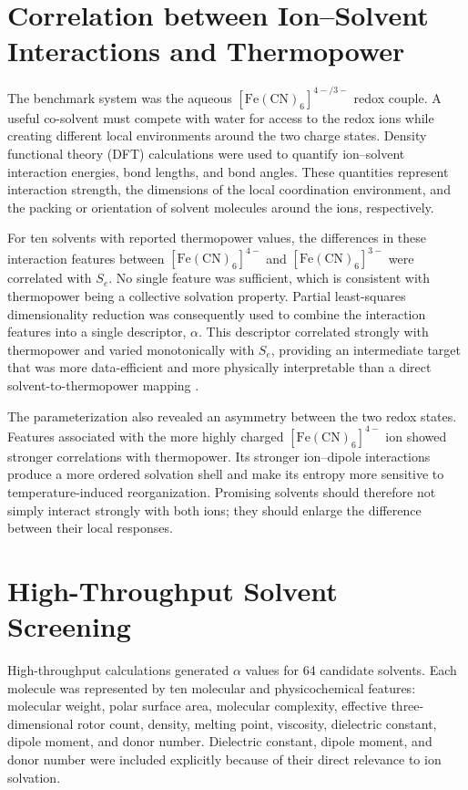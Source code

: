 \section{Correlation between Ion--Solvent Interactions and Thermopower}

The benchmark system was the aqueous
$[\mathrm{Fe(CN)}_6]^{4-/3-}$ redox couple. A useful co-solvent must compete
with water for access to the redox ions while creating different local
environments around the two charge states. Density functional theory (DFT)
calculations were used to quantify ion--solvent interaction energies, bond
lengths, and bond angles. These quantities represent interaction strength, the
dimensions of the local coordination environment, and the packing or
orientation of solvent molecules around the ions, respectively.

For ten solvents with reported thermopower values, the differences in these
interaction features between $[\mathrm{Fe(CN)}_6]^{4-}$ and
$[\mathrm{Fe(CN)}_6]^{3-}$ were correlated with $S_e$. No single feature was
sufficient, which is consistent with thermopower being a collective solvation
property. Partial least-squares dimensionality reduction was consequently used
to combine the interaction features into a single descriptor, $\alpha$. This
descriptor correlated strongly with thermopower and varied monotonically with
$S_e$, providing an intermediate target that was more data-efficient and more
physically interpretable than a direct solvent-to-thermopower mapping
.

The parameterization also revealed an asymmetry between the two redox states.
Features associated with the more highly charged
$[\mathrm{Fe(CN)}_6]^{4-}$ ion showed stronger correlations with
thermopower. Its stronger ion--dipole interactions produce a more ordered
solvation shell and make its entropy more sensitive to temperature-induced
reorganization. Promising solvents should therefore not simply interact
strongly with both ions; they should enlarge the difference between their
local responses.

\section{High-Throughput Solvent Screening}

High-throughput calculations generated $\alpha$ values for 64 candidate
solvents. Each molecule was represented by ten molecular and physicochemical
features: molecular weight, polar surface area, molecular complexity,
effective three-dimensional rotor count, density, melting point, viscosity,
dielectric constant, dipole moment, and donor number. Dielectric constant,
dipole moment, and donor number were included explicitly because of their
direct relevance to ion solvation.

